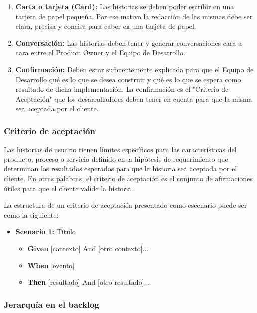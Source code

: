 \begin{enumerate}

\item \textbf{Carta o tarjeta (Card):} Las historias se deben poder escribir en una tarjeta de papel pequeña. Por ese motivo la redacción de las mismas debe ser clara, precisa y concisa para caber en una tarjeta de papel.

\item \textbf{Conversación:} Las historias deben tener y generar conversaciones cara a cara entre el Product Owner y el Equipo de Desarrollo.

\item \textbf{Confirmación:} Deben estar suficientemente explicada para que el Equipo de Desarrollo qué es lo que se desea construir y qué es lo que se espera como resultado de dicha implementación. La confirmación es el "Criterio de Aceptación" que los desarrolladores deben tener en cuenta para que la misma sea aceptada por el cliente.

\end{enumerate}

\subsubsection{Criterio de aceptación}

Las historias de usuario tienen límites específicos para las características del producto, proceso o servicio definido en la hipótesis de requerimiento que determinan los resultados esperados para que la historia sea aceptada por el cliente. En otras palabras, el criterio de aceptación es el conjunto de afirmaciones útiles para que el cliente valide la historia.

La estructura de un criterio de aceptación presentado como escenario puede ser como la siguiente:

\begin{itemize}
\item \textbf{Scenario 1:} Título
  \begin{itemize}
  \item \textbf{Given} [contexto] And [otro contexto]...
  \item \textbf{When}  [evento] 
  \item \textbf{Then}  [resultado] And [otro resultado]...
  \end{itemize}
\end{itemize}

\subsubsection{Jerarquía en el backlog}

